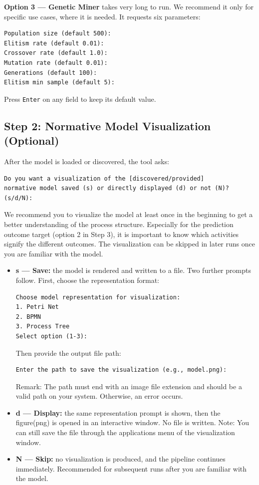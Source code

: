 \documentclass[12pt,a4paper]{article}
\begin{document}
\textbf{Option 3 --- Genetic Miner} takes very long to run. We recommend it only for specific use cases, where it is needed. It requests six parameters:
\begin{verbatim}
Population size (default 500):
Elitism rate (default 0.01):
Crossover rate (default 1.0):
Mutation rate (default 0.01):
Generations (default 100):
Elitism min sample (default 5):
\end{verbatim}
Press \texttt{Enter} on any field to keep its default value.

\subsection{Step 2: Normative Model Visualization (Optional)}
After the model is loaded or discovered, the tool asks:
\begin{verbatim}
Do you want a visualization of the [discovered/provided]
normative model saved (s) or directly displayed (d) or not (N)?
(s/d/N):
\end{verbatim}
We recommend you to visualize the model at least once in the beginning to get a better understanding of the process structure. Especially for the prediction outcome target (option 2 in Step 3), it is important to know which activities signify the different outcomes. The visualization can be skipped in later runs once you are familiar with the model.
\begin{itemize}
    \item \textbf{s --- Save:} the model is rendered and written to a file. Two further prompts follow. First, choose the representation format:
    \begin{verbatim}
Choose model representation for visualization:
1. Petri Net
2. BPMN
3. Process Tree
Select option (1-3):
    \end{verbatim}
    Then provide the output file path:
    \begin{verbatim}
Enter the path to save the visualization (e.g., model.png):
    \end{verbatim}
Remark: The path must end with an image file extension and should be a valid path on your system. Otherwise, an error occurs.
    \item \textbf{d --- Display:} the same representation prompt is shown, then the figure(png) is opened in an interactive window. No file is written. Note: You can still save the file through the applications menu of the visualization window. 
    \item \textbf{N --- Skip:} no visualization is produced, and the pipeline continues immediately. Recommended for subsequent runs after you are familiar with the model.
\end{itemize}
\end{document}
